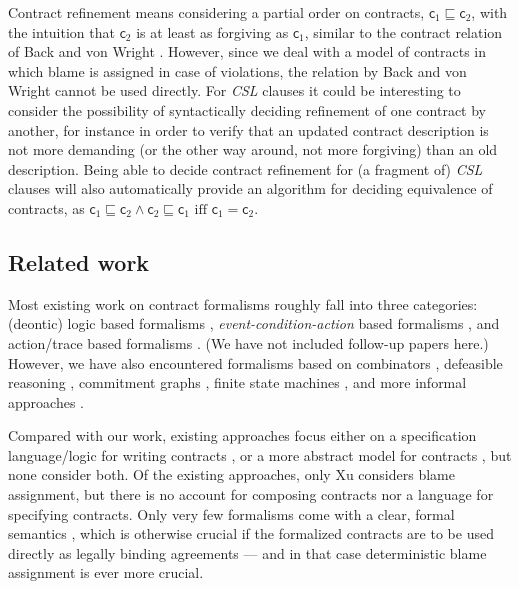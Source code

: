 \documentclass[orivec,final]{llncs-href}
\newcommand{\contract}{\mathsf{c}}
\newcommand{\csl}{\textit{CSL}}
\begin{document}
Contract refinement means considering a partial order on
contracts, $\contract_1 \sqsubseteq \contract_2$, with the intuition
that $\contract_2$ is at least as forgiving as $\contract_1$, similar
to the contract relation of Back and von Wright
\cite{back00cgr}. However, since we deal with a model of contracts in
which blame is assigned in case of violations, the relation by Back
and von Wright cannot be used directly. For \csl{}
clauses it could be interesting to consider the possibility of
syntactically deciding refinement of one contract by another, for
instance in order to verify that an updated contract description is
not more demanding (or the other way around, not more forgiving) than
an old description. Being able to decide contract refinement for (a
fragment of) \csl{} clauses will also automatically provide an
algorithm for deciding equivalence of contracts, as $\contract_1
\sqsubseteq \contract_2 \land \contract_2 \sqsubseteq \contract_1
\mbox{ iff } \contract_1 = \contract_2$.

\subsection{Related work}\label{sec:relatedwork}
Most existing work on contract formalisms roughly fall into three
categories: (deontic) logic based formalisms
\cite{lee88electroniccontracting,boulmakoul02integratedcontract}, 
\emph{event-condition-action} \cite{bernstein01db} based formalisms
\cite{goodchild00b2b,governatori06formalbcl},
and action/trace based formalisms
\cite{andersen06contracts,prisacariu07cl}. (We have not included
follow-up papers here.) However, we have also encountered formalisms
based on combinators \cite{jones03contracts}, defeasible reasoning
\cite{tan00incas,governatori09drcontract}, 
commitment graphs \cite{xu04multipartycontracts}, finite state
machines \cite{molina04runtimemonitoring}, and more informal
approaches \cite{crf04cel,oren09towards}.

Compared with our work, existing approaches focus either on a
specification language/logic for writing contracts 
\cite{lee88electroniccontracting,boulmakoul02integratedcontract,goodchild00b2b,governatori06formalbcl,andersen06contracts,prisacariu07cl,jones03contracts,tan00incas,governatori09drcontract,crf04cel},
or a more abstract model for contracts
\cite{xu04multipartycontracts,oren09towards,molina04runtimemonitoring},
but none consider both. Of the existing approaches, only Xu
\cite{xu04multipartycontracts} considers blame assignment, but there
is no account for composing contracts nor a language for specifying
contracts. Only very few formalisms come with a clear, formal semantics
\cite{prisacariu07cl,andersen06contracts}, which is otherwise crucial
if the formalized contracts are to be used directly as legally binding
agreements --- and in that case deterministic blame assignment is ever
more crucial.
\end{document}
